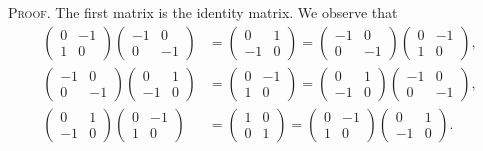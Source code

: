 \documentclass[11pt, leqno]{article}
\begin{document}
\textsc{Proof}. The first matrix is the identity matrix. We observe that 
\begin{align*}
  \begin{pmatrix} 0 & -1 \\ 1 & 0 \end{pmatrix}
  \begin{pmatrix} -1 & 0 \\ 0 & -1 \end{pmatrix}
                              &= \begin{pmatrix} 0 & 1 \\ -1 & 0 \end{pmatrix}
                                                               = \begin{pmatrix} -1 & 0 \\ 0 & -1 \end{pmatrix}
  \begin{pmatrix} 0 & -1 \\ 1 & 0 \end{pmatrix},\\
  \begin{pmatrix} -1 & 0 \\ 0 & -1 \end{pmatrix}
                                \begin{pmatrix} 0 & 1 \\ -1 & 0 \end{pmatrix}
                              &= \begin{pmatrix} 0 & -1 \\ 1 & 0 \end{pmatrix}
                                                               = \begin{pmatrix} 0 & 1 \\ -1 & 0 \end{pmatrix}
  \begin{pmatrix} -1 & 0 \\ 0 & -1 \end{pmatrix},\\
  \begin{pmatrix} 0 & 1 \\ -1 & 0 \end{pmatrix}
                                \begin{pmatrix} 0 & -1 \\ 1 & 0 \end{pmatrix}
                              &= \begin{pmatrix} 1 & 0 \\ 0 & 1 \end{pmatrix}
  = \begin{pmatrix} 0 & -1 \\ 1  & 0 \end{pmatrix} \begin{pmatrix} 0 & 1 \\ -1 & 0 \end{pmatrix}.
\end{align*}
\end{document}
